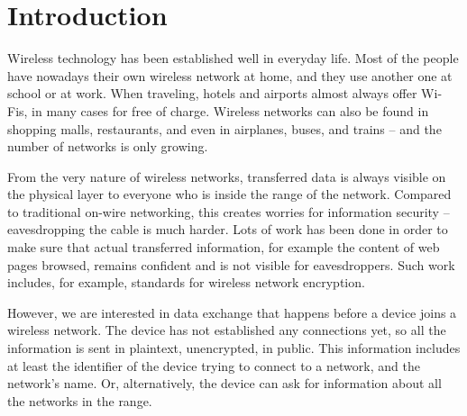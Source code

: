 \documentclass[12pt,a4paper,oneside,pdftex]{report}
\begin{document}

\label{pages-prelude}
\cleardoublepage

\startfirstchapter

\pagestyle{headings}




\chapter{Introduction}
\label{chapter:intro}

Wireless technology has been established well in everyday life. Most of the people have nowadays their own wireless network at home, and they use another one at school or at work. When traveling, hotels and airports almost always offer Wi-Fis, in many cases for free of charge. Wireless networks can also be found in shopping malls, restaurants, and even in airplanes, buses, and trains -- and the number of networks is only growing.

From the very nature of wireless networks, transferred data is always visible on the physical layer to everyone who is inside the range of the network. Compared to traditional on-wire networking, this creates worries for information security -- eavesdropping the cable is much harder. Lots of work has been done in order to make sure that actual transferred information, for example the content of web pages browsed, remains confident and is not visible for eavesdroppers. Such work includes, for example, standards for wireless network encryption.

However, we are interested in data exchange that happens before a device joins a wireless network. The device has not established any connections yet, so all the information is sent in plaintext, unencrypted, in public. This information includes at least the identifier of the device trying to connect to a network, and the network's name. Or, alternatively, the device can ask for information about all the networks in the range.
\end{document}
